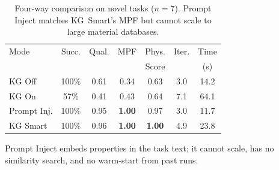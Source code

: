 \begin{table}[t]
\centering
\caption{Four-way comparison on novel tasks ($n{=}7$).  Prompt Inject
matches KG~Smart's MPF but cannot scale to large material databases.}
\label{tab:four-way}
\footnotesize
\setlength{\tabcolsep}{3pt}
\begin{tabular}{@{}lcccccc@{}}
\toprule
Mode & Succ. & Qual. & MPF & Phys. & Iter. & Time \\
     &       &       &     & Score &       & (s)  \\
\midrule
KG Off        & 100\% & 0.61 & 0.34 & 0.63 & 3.0 & 14.2 \\
KG On         &  57\% & 0.41 & 0.43 & 0.64 & 7.1 & 64.1 \\
Prompt Inj.   & 100\% & 0.95 & \textbf{1.00} & 0.97 & 3.0 & 11.7 \\
KG Smart      & 100\% & 0.96 & \textbf{1.00} & \textbf{1.00} & 4.9 & 23.8 \\
\bottomrule
\end{tabular}

\vspace{0.3em}
{\scriptsize Prompt Inject embeds properties in the task text; it cannot
scale, has no similarity search, and no warm-start from past runs.}
\end{table}
